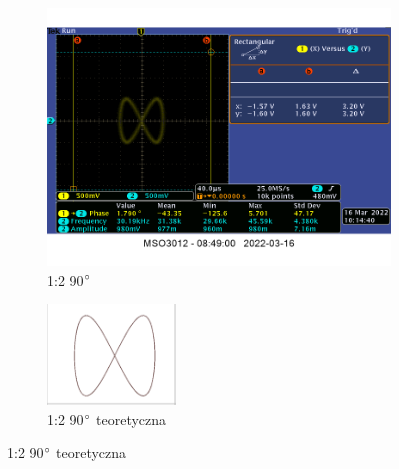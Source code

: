 {    \begin{figure}[H]
        \centering
        \begin{subfigure}[h]{0.45\textwidth}
            \includegraphics[scale=0.3]{images/1_5_1-2-90.png}
            \caption*{1:2 90$\degree$}
        \end{subfigure}
        \begin{subfigure}[h]{0.45\textwidth}
            \includegraphics[scale=1.9]{images/theoretical/1-2-90.png}
            \caption*{1:2 90$\degree$ teoretyczna}
        \end{subfigure}
    \end{figure}
    
}
